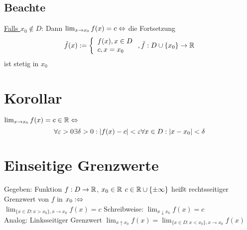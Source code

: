 \subsection*{Beachte}
\underline{Falls $x_0 \notin D$}: Dann $\lim_{x \to x_0} f(x) = c \Leftrightarrow$ die Fortsetzung
$$\tilde{f}(x) := \left\{ \begin{array}{l} f(x), x \in D \\ c, x = x_0 \end{array} \right., \tilde{f}: D \cup \{x_0\} \to \mathbb{R}$$
ist stetig in $x_0$

\section{Korollar}\label{9.12}
$\lim_{x \to x_0} f(x) = c \in \mathbb{R} \Leftrightarrow$
$$\forall \varepsilon > 0 \exists \delta > 0: |f(x)-c| < \varepsilon \forall x \in D: |x-x_0| < \delta$$

\newpage

\section{Einseitige Grenzwerte}\label{9.13}
Gegeben: Funktion $f: D \to \mathbb{R}$, $x_0 \in \mathbb{R}$\nl
$c \in \mathbb{R} \cup \{\pm\infty\}$ heißt rechtsseitiger Grenzwert von $f$ in $x_0 :\Leftrightarrow$\\
$\lim_{\{x \in D: x > x_0\}, x \to x_0} f(x) = c$\nl
Schreibweise: $\lim_{x \downarrow x_0} f(x) = c$\\
Analog: Linksseitiger Grenzwert $\lim_{x \uparrow x_0} f(x) = \lim_{\{x \in D: x < x_0\}, x \to x_0} f(x)$\nl
{}

